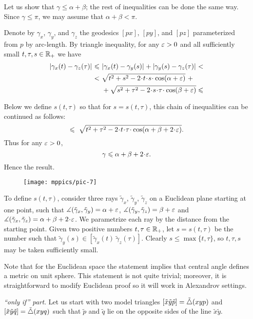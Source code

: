 

Let us show that $\gamma\le\alpha+\beta$; the rest of inequalities can be done the same way.
Since $\gamma\le\pi$, we may assume that $\alpha+\beta< \pi$.

Denote by $\gamma_x$, $\gamma_y$, and $\gamma_z$ the geodesics $[px]$, $[py]$, and $[pz]$ parameterized from $p$ by arc-length.
By triangle inequality,
for any $\varepsilon>0$ and all sufficiently small $t,\tau,s\in\mathbb{R}_+$ we have
\begin{align*}
\dist{\gamma_x(t)}{\gamma_z(\tau)}{}
\le 
\ &\dist{\gamma_x(t)}{\gamma_y(s)}{}+\dist{\gamma_y(s)}{\gamma_z(\tau)}{}<\\
<
\ &\sqrt{t^2+s^2-2\cdot t\cdot  s\cdot \cos(\alpha+\eps)}\ +
\\
&+\sqrt{s^2+\tau^2-2\cdot s\cdot \tau\cdot \cos(\beta+\eps)}\le
\end{align*}

Below we define 
$s(t,\tau)$ so that for 
$s=s(t,\tau)$, this chain of inequalities can be continued as follows:
\[\le
\ \sqrt{t^2+\tau^2-2\cdot t\cdot \tau\cdot \cos(\alpha+\beta+2\cdot \eps)}.
\]
Thus for any $\varepsilon>0$, 
\[\gamma\le \alpha+\beta+2\cdot \eps.\]
Hence the result.

\begin{wrapfigure}{o}{30 mm}
\vskip-8mm
\centering
\texttt{[image: mppics/pic-7]}
\end{wrapfigure}

To define $s(t,\tau)$, consider three rays $\tilde \gamma_x$, $\tilde \gamma_y$, $\tilde \gamma_z$ on a Euclidean plane starting at one point, such that $\measuredangle(\tilde \gamma_x,\tilde \gamma_y)=\alpha+\varepsilon$,
$\measuredangle(\tilde \gamma_y,\tilde \gamma_z)=\beta+\varepsilon$ and $\mangle(\tilde \gamma_x,\tilde \gamma_z)=\alpha+\beta+2\cdot \eps$.
We parametrize each ray by the distance from the starting point.
Given two positive numbers $t,\tau\in\mathbb{R}_+$, let $s=s(t,\tau)$ be 
the number such that 
$\tilde \gamma_y(s)\in[\tilde \gamma_x(t)\ \tilde \gamma_z(\tau)]$. 
Clearly $s\le\max\{t,\tau\}$, so $t,\tau,s$ may be taken sufficiently small.

Note that for the Euclidean space the statement implies that central angle defines a metric on unit sphere.
This statement is not quite trivial; moreover, it is straightforward to modify Euclidean proof so it will work in Alexandrov settings. 

\parbf{\ref{ex:sba-2+2-short};} \textit{``only if'' part.}
Let us start with two model triangles $[\tilde x\tilde y\tilde p]=\tilde\triangle(xyp)$ and $[\tilde x\tilde y\tilde q]=\tilde\triangle(xyq)$ such that $\tilde p$ and $\tilde q$ lie on the opposite sides of the line $\tilde x\tilde y$.


